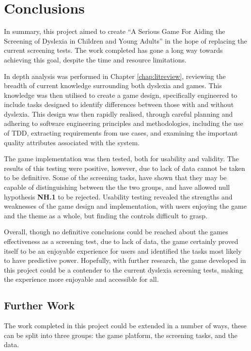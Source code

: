 \documentclass[journal]{IEEEtran}
\begin{document}
\section{Conclusions}

In summary, this project aimed to create ``A Serious Game For Aiding the Screening of Dyslexia in Children and Young Adults'' in the hope of replacing the current screening tests. The work completed has gone a long way towards achieving this goal, despite the time and resource limitations. 

In depth analysis was performed in Chapter \ref{chap:litreview}, reviewing the breadth of current knowledge surrounding both dyslexia and games. This knowledge was then utilised to create a game design, specifically engineered to include tasks designed to identify differences between those with and without dyslexia. 
This design was then rapidly realised, through careful planning and adhering to software engineering principles and methodologies, including the use of TDD, extracting requirements from use cases, and examining the important quality attributes associated with the system.
 
The game implementation was then tested, both for usability and validity. The results of this testing were positive, however, due to lack of data cannot be taken to be definitive. Some of the screening tasks, have shown that they may be capable of distinguishing between the the two groups, and have allowed null hypothesis \textbf{NH.1} to be rejected. Usability testing revealed the strengths and weaknesses of the game design and implementation, with users enjoying the game and the theme as a whole, but finding the controls difficult to grasp.

Overall, though no definitive conclusions could be reached about the games effectiveness as a screening test, due to lack of data, the game certainly proved itself to be an enjoyable experience for users and identified the tasks most likely to have predictive power. Hopefully, with further research, the game developed in this project could be a contender to the current dyslexia screening tests, making the experience more enjoyable and accessible for all.

\subsection{Further Work}
The work completed in this project could be extended in a number of ways, these can be split into three groups: the game platform, the screening tasks, and the data.
\end{document}
